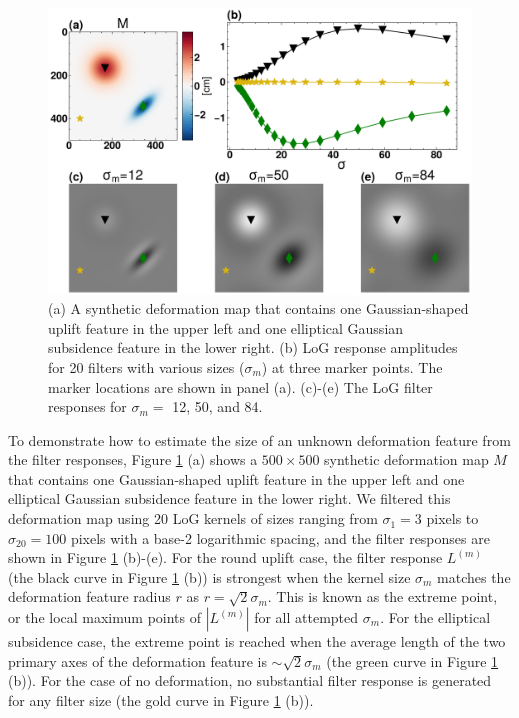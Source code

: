 \begin{figure}
	\centering
	\includegraphics[width=0.59\linewidth]{figures/chapter6-blobs/figure2_log_response.pdf}
	\caption{
		(a) A synthetic deformation map that contains one Gaussian-shaped uplift feature in the upper left and one elliptical Gaussian subsidence feature in the lower right. (b) LoG response amplitudes for 20 filters with various sizes ($\sigma_m$) at three marker points. The marker locations are shown in panel (a). (c)-(e) The LoG filter responses for $\sigma_m=$ 12, 50, and 84.}
	\label{fig:log-response}
\end{figure}


To demonstrate how to estimate the size of an unknown deformation feature from the filter responses, Figure \ref{fig:log-response} (a) shows a $500 \times 500$ synthetic deformation map $M$ that contains one Gaussian-shaped uplift feature in the upper left and one elliptical Gaussian subsidence feature in the lower right. We filtered this deformation map using 20 LoG kernels of sizes ranging from $\sigma_1 = 3$ pixels to $\sigma_{20} = 100$ pixels with a base-2 logarithmic spacing, and the filter responses are shown in Figure \ref{fig:log-response} (b)-(e). For the round uplift case, the filter response $L^{(m)}$ (the black curve in Figure \ref{fig:log-response} (b)) is strongest when the kernel size $\sigma_m$ matches the deformation feature radius $r$ as $r = \sqrt{2}\sigma_m$. This is known as the extreme point, or the local maximum points of $|L^{(m)}|$ for all attempted $\sigma_m$. For the elliptical subsidence case, the extreme point is reached when the average length of the two primary axes of the deformation feature is $\sim \sqrt{2}\sigma_m$ (the green curve in Figure \ref{fig:log-response} (b)). For the case of no deformation, no substantial filter response is generated for any filter size (the gold curve in Figure \ref{fig:log-response} (b)).




